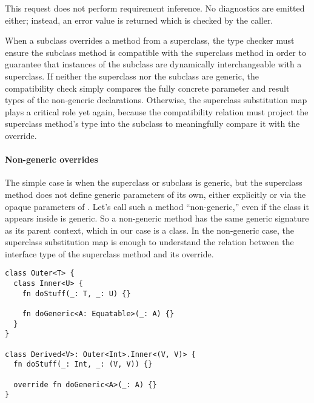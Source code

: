 \documentclass[../generics]{subfiles}
\begin{document}
This request does not perform requirement inference. No diagnostics are emitted either; instead, an error value is returned which is checked by the caller.

\iffalse

When a subclass overrides a method from a superclass, the type checker must ensure the subclass method is compatible with the superclass method in order to guarantee that instances of the subclass are dynamically interchangeable with a superclass. If neither the superclass nor the subclass are generic, the compatibility check simply compares the fully concrete parameter and result types of the non-generic declarations. Otherwise, the superclass substitution map plays a critical role yet again, because the compatibility relation must project the superclass method's type into the subclass to meaningfully compare it with the override.

\paragraph{Non-generic overrides}
The simple case is when the superclass or subclass is generic, but the superclass method does not define generic parameters of its own, either explicitly or via the opaque parameters of . Let's call such a method ``non-generic,'' even if the class it appears inside is generic. So a non-generic method has the same generic signature as its parent context, which in our case is a class. In the non-generic case, the superclass substitution map is enough to understand the relation between the interface type of the superclass method and its override.

\begin{listing}\label{method overrides}
\begin{Verbatim}
class Outer<T> {
  class Inner<U> {
    fn doStuff(_: T, _: U) {}

    fn doGeneric<A: Equatable>(_: A) {}
  }
}

class Derived<V>: Outer<Int>.Inner<(V, V)> {
  fn doStuff(_: Int, _: (V, V)) {}

  override fn doGeneric<A>(_: A) {}
}
\end{Verbatim}
\end{listing}
\end{document}
